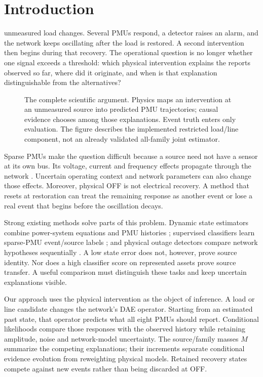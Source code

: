 \section{Introduction}
\label{sec:introduction}

 unmeasured load changes. Several PMUs respond, a detector raises an alarm, and the network keeps oscillating after the load is restored. A second intervention then begins during that recovery. The operational question is no longer whether one signal exceeds a threshold: which physical intervention explains the reports observed so far, where did it originate, and when is that explanation distinguishable from the alternatives?

\begin{figure}[t]\centering
\resizebox{\textwidth}{!}{}
\caption{The complete scientific argument. Physics maps an intervention at an unmeasured source into predicted PMU trajectories; causal evidence chooses among those explanations. Event truth enters only evaluation. The figure describes the implemented restricted load/line component, not an already validated all-family joint estimator.}
\label{fig:joint-architecture}\end{figure}

Sparse PMUs make the question difficult because a source need not have a sensor at its own bus. Its voltage, current and frequency effects propagate through the network \cite{phadke2008synchronized,zhao2019dse}. Uncertain operating context and network parameters can also change those effects. Moreover, physical OFF is not electrical recovery. A method that resets at restoration can treat the remaining response as another event or lose a real event that begins before the oscillation decays.

Strong existing methods solve parts of this problem. Dynamic state estimators combine power-system equations and PMU histories \cite{katanic2024recursive}; supervised classifiers learn sparse-PMU event/source labels \cite{pandey2020realtime,yildiz2024few}; and physical outage detectors compare network hypotheses sequentially \cite{chen2016quickest,rovatsos2017outage}. A low state error does not, however, prove source identity. Nor does a high classifier score on represented assets prove source transfer. A useful comparison must distinguish these tasks and keep uncertain explanations visible.

Our approach uses the physical intervention as the object of inference. A load or line candidate changes the network's DAE operator. Starting from an estimated past state, that operator predicts what all eight PMUs should report. Conditional likelihoods compare those responses with the observed history while retaining amplitude, noise and network-model uncertainty. The source/family masses $M$ summarize the competing explanations; their increments separate conditional evidence evolution from reweighting physical models. Retained recovery states compete against new events rather than being discarded at OFF.


